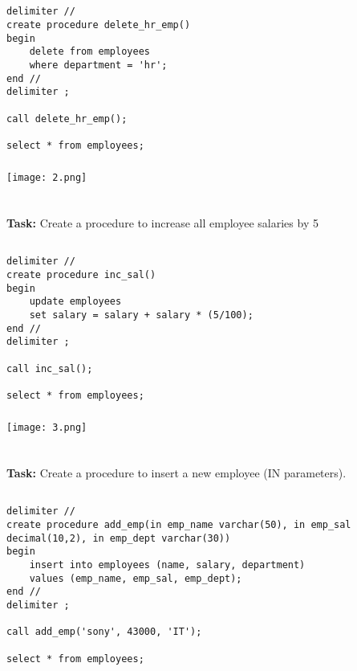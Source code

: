 \documentclass[12pt,a4paper]{article}
\begin{document}
\subsection{}
\begin{lstlisting}
delimiter //
create procedure delete_hr_emp()
begin
    delete from employees
    where department = 'hr';
end //
delimiter ;

call delete_hr_emp();

select * from employees;
\end{lstlisting}

\subsubsection{}
\begin{center}
    \texttt{[image: 2.png]}
\end{center}


\section{}
\textbf{Task:} Create a procedure to increase all employee salaries by 5%

\subsection{}
\begin{lstlisting}
delimiter //
create procedure inc_sal()
begin
    update employees 
    set salary = salary + salary * (5/100);
end //
delimiter ;

call inc_sal();

select * from employees;
\end{lstlisting}

\subsubsection{}
\begin{center}
    \texttt{[image: 3.png]}
\end{center}


\section{}
\textbf{Task:} Create a procedure to insert a new employee (IN parameters).

\subsection{}
\begin{lstlisting}
delimiter //
create procedure add_emp(in emp_name varchar(50), in emp_sal decimal(10,2), in emp_dept varchar(30))
begin
    insert into employees (name, salary, department)
    values (emp_name, emp_sal, emp_dept);
end //
delimiter ;

call add_emp('sony', 43000, 'IT');

select * from employees;
\end{lstlisting}
\end{document}

